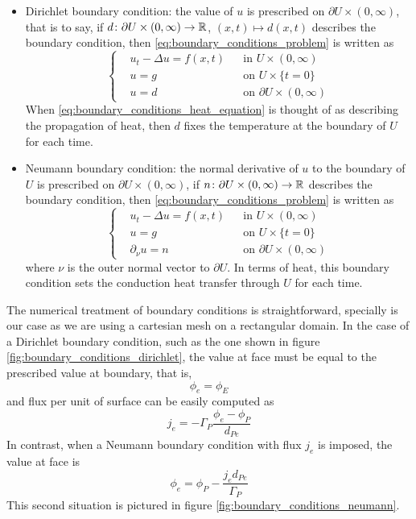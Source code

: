 \begin{itemize}[topsep=0pt]
	\item Dirichlet boundary condition: the value of $u$ is prescribed on
	$\partial U \times (0,\infty)$, that is to say, if $d \colon \partial U
	\times (0,\infty) \rightarrow \mathbb{R}$, $(x, t) \mapsto d(x, t)$
	describes the boundary condition, then
	\eqref{eq:boundary_conditions_problem} is written as
	\begin{equation}
		\left\{
		\begin{aligned}
			&u_t - \Delta u = f(x, t) & &\text{in } U \times (0,\infty) \\
			&u = g & &\text{on } U \times \{ t = 0 \} \\
			&u = d & &\text{on } \partial U \times (0,\infty)
		\end{aligned}
		\right.
	\end{equation}
	When \eqref{eq:boundary_conditions_heat_equation} is thought of as
	describing the propagation of heat, then $d$ fixes the temperature at the
	boundary of $U$ for each time.
	\item Neumann boundary condition: the normal derivative of $u$ to the
	boundary of $U$ is prescribed on $\partial U \times (0,\infty)$, \ie if $n
	\colon \partial U \times (0,\infty) \rightarrow \mathbb{R}$ describes the
	boundary condition, then \eqref{eq:boundary_conditions_problem} is written
	as
	\begin{equation}
		\left\{
		\begin{aligned}
			&u_t - \Delta u = f(x, t) 	& &\text{in } U \times (0,\infty) \\
			&u = g 							& &\text{on } U \times \{ t = 0 \} \\
			&\partial_{\nu} u = n 			& &\text{on } \partial U \times (0,\infty)
		\end{aligned}
		\right.
	\end{equation}
	where $\nu$ is the outer normal vector to $\partial U$. In terms of heat,
	this boundary condition sets the conduction heat transfer through $U$ for
	each time.
\end{itemize}

The numerical treatment of boundary conditions is straightforward, specially is
our case as we are using a cartesian mesh on a rectangular domain. In the
case of a Dirichlet boundary condition, such as the one shown in figure
\ref{fig:boundary_conditions_dirichlet}, the value at face must be equal to the
prescribed value at boundary, that is,
\begin{equation}
	\phi_e = \phi_E
\end{equation}
and flux per unit of surface can be easily computed as
\begin{equation}
	j_e = -\Gamma_P \frac{\phi_e - \phi_P}{d_{Pe}}
\end{equation}
In contrast, when a Neumann boundary condition with flux $j_e$ is imposed, the value at
face is
\begin{equation}
	\phi_e = \phi_P - \frac{j_e d_{Pe}}{\Gamma_P}
\end{equation}
This second situation is pictured in figure
\ref{fig:boundary_conditions_neumann}.

